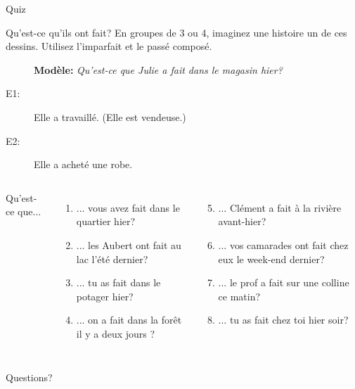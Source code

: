 \documentclass{beamer}
\begin{document}
  \begin{frame}{}
    \begin{center}
      \Large Quiz
    \end{center}
  \end{frame}

  \begin{frame}{Qu'est-ce qu'ils ont fait?}
    En groupes de 3 ou 4, imaginez une histoire un de ces dessins.
    Utilisez l'imparfait et le passé composé.
    \begin{description}
      \item[] \textbf{Modèle:} \emph{Qu'est-ce que Julie a fait dans le magasin hier?}
      \item[E1:] Elle a travaillé. (Elle est vendeuse.)
      \item[E2:] Elle a acheté une robe.
    \end{description}
    \begin{columns}[t]
        Qu'est-ce que...
        \begin{enumerate}
          \item ... vous avez fait dans le quartier hier?
          \item ... les Aubert ont fait au lac l'été dernier?
          \item ... tu as fait dans le potager hier?
          \item ... on a fait dans la forêt il y a deux jours ?
        \end{enumerate}
        \begin{enumerate}
          \setcounter{enumi}{4}
          \item ... Clément a fait à la rivière avant-hier?
          \item ... vos camarades ont fait chez eux le week-end dernier?
          \item ... le prof a fait sur une colline ce matin?
          \item ... tu as fait chez toi hier soir?
        \end{enumerate}
    \end{columns}
  \end{frame}

  \begin{frame}{}
    \begin{center}
      \Large Questions?
    \end{center}
  \end{frame}
\end{document}
